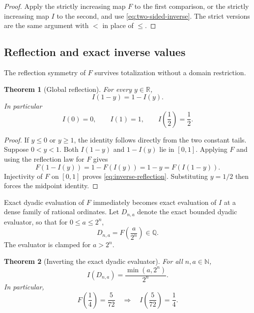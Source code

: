 \documentclass[11pt,oneside]{article}
\newtheorem{theorem}{Theorem}[section]
\theoremstyle{definition}
\theoremstyle{remark}
\newcommand{\R}{\mathbb R}
\newcommand{\Q}{\mathbb Q}
\newcommand{\N}{\mathbb N}
\begin{document}
\begin{proof}
Apply the strictly increasing map $F$ to the first comparison, or the strictly increasing map
$I$ to the second, and use \eqref{eq:two-sided-inverse}.  The strict versions are the same
argument with $<$ in place of $\le$.
\end{proof}

\subsection{Reflection and exact inverse values}

The reflection symmetry of $F$ survives totalization without a domain restriction.

\begin{theorem}[Global reflection]
\label{thm:inverse-reflection}
For every $y\in\R$,
\begin{equation}
 I(1-y)=1-I(y).
 \label{eq:inverse-reflection}
\end{equation}
In particular
\begin{equation}
 I(0)=0,
 \qquad
 I(1)=1,
 \qquad
 I\!\left(\frac12\right)=\frac12.
 \label{eq:inverse-basic-values}
\end{equation}
\end{theorem}

\begin{proof}
If $y\le0$ or $y\ge1$, the identity follows directly from the two constant tails.  Suppose
$0<y<1$.  Both $I(1-y)$ and $1-I(y)$ lie in $[0,1]$.  Applying $F$ and using the reflection
law for $F$ gives
\[
 F(1-I(y))=1-F(I(y))=1-y=F(I(1-y)).
\]
Injectivity of $F$ on $[0,1]$ proves \eqref{eq:inverse-reflection}.  Substituting
$y=1/2$ then forces the midpoint identity.
\end{proof}

Exact dyadic evaluation of $F$ immediately becomes exact evaluation of $I$ at a dense family
of rational ordinates.  Let $D_{n,a}$ denote the exact bounded dyadic evaluator, so that for
$0\le a\le2^n$,
\begin{equation}
 D_{n,a}=F\!\left(\frac{a}{2^n}\right)\in\Q.
 \label{eq:dyadic-evaluator-input}
\end{equation}
The evaluator is clamped for $a>2^n$.

\begin{theorem}[Inverting the exact dyadic evaluator]
\label{thm:inverse-dyadic-evaluator}
For all $n,a\in\N$,
\begin{equation}
 I(D_{n,a})=\frac{\min(a,2^n)}{2^n}.
 \label{eq:inverse-dyadic-evaluator}
\end{equation}
In particular,
\begin{equation}
 F\!\left(\frac14\right)=\frac5{72}
 \quad\Longrightarrow\quad
 I\!\left(\frac5{72}\right)=\frac14.
 \label{eq:inverse-five-seventy-two}
\end{equation}
\end{theorem}
\end{document}
